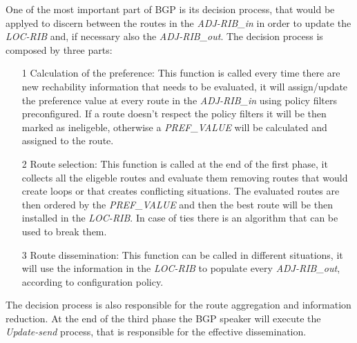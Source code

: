 One of the most important part of \ac{BGP} is its decision process, that would
be applyed to discern between the routes in the \textit{ADJ-RIB\_in} in order
to update the \textit{LOC-RIB} and, if necessary also the \textit{ADJ-RIB\_out}.
The decision process is composed by three parts:
\begin{itemize}
	\item[1] Calculation of the preference: This function is called every time
		there are new rechability information that needs to be evaluated, it 
		will assign/update the preference value at every route in the 
		\textit{ADJ-RIB\_in} using policy filters preconfigured. If a route
		doesn't respect the policy filters it will be then marked as ineligeble,
		otherwise a \textit{PREF\_VALUE} will be calculated and assigned to the
		route.
	\item[2] Route selection: This function is called at the end of the first
		phase, it collects all the eligeble routes and evaluate them removing
		routes that would create loops or that creates conflicting situations.
		The evaluated routes are then ordered by the \textit{PREF\_VALUE} and
		then the best route will be then installed in the \textit{LOC-RIB}.
		In case of ties there is an algorithm that can be used to break them.
	\item[3] Route dissemination: This function can be called in different
		situations, it will use the information in the \textit{LOC-RIB} to
		populate every \textit{ADJ-RIB\_out}, according to configuration
		policy.
\end{itemize}
The decision process is also responsible for the route aggregation and information
reduction.
At the end of the third phase the \ac{BGP} speaker will execute the
\textit{Update-send} process, that is responsible for the effective dissemination.

